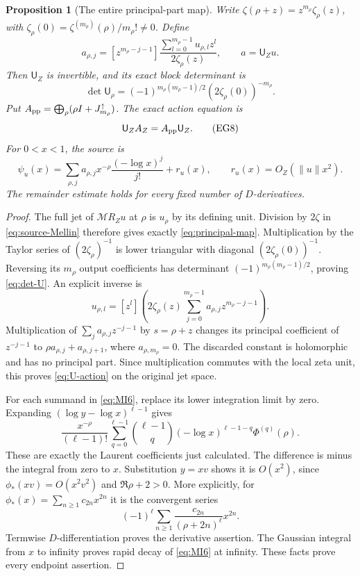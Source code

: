 \documentclass[11pt]{article}
\newtheorem{proposition}[theorem]{Proposition}
\newcommand{\M}{\mathcal M}\newcommand{\G}{\mathsf G}
\newcommand{\U}{\mathsf U}\newcommand{\E}{\mathsf E}
\begin{document}
\begin{proposition}[The entire principal-part map]\label{prop:principal}
Write $\zeta(\rho+z)=z^{m_\rho}\zeta_\rho(z)$, with
$\zeta_\rho(0)=\zeta^{(m_\rho)}(\rho)/m_\rho!\ne0$. Define
\[
 a_{\rho,j}=[z^{m_\rho-j-1}]
 \frac{\sum_{l=0}^{m_\rho-1}u_{\rho,l}z^l}{2\zeta_\rho(z)},
 \qquad a=\U_Zu.\tag{EG6}\label{eq:principal-map}
\]
Then $\U_Z$ is invertible, and its exact block determinant is
\[
 \det\U_\rho=(-1)^{m_\rho(m_\rho-1)/2}
                         (2\zeta_\rho(0))^{-m_\rho}.
 \tag{EG7}\label{eq:det-U}
\]
Put $A_{\rm pp}=\bigoplus_\rho(\rho I+J^\uparrow_{m_\rho})$.
The exact action equation is
\[
 \U_ZA_Z=A_{\rm pp}\U_Z.\tag{EG8}\label{eq:U-action}
\]
For $0<x<1$, the source is
\[
 \psi_u(x)=\sum_{\rho,j}a_{\rho,j}
                   x^{-\rho}\frac{(-\log x)^j}{j!}+r_u(x),
 \qquad r_u(x)=O_Z(\|u\|x^2).
 \tag{EG9}\label{eq:source-singular}
\]
The remainder estimate holds for every fixed number of $D$-derivatives.
\end{proposition}
\begin{proof}
The full jet of $\M R_Zu$ at $\rho$ is $u_\rho$ by its defining
unit. Division by $2\zeta$ in \eqref{eq:source-Mellin} therefore gives
exactly \eqref{eq:principal-map}. Multiplication by the Taylor series
of $(2\zeta_\rho)^{-1}$ is lower triangular with diagonal
$(2\zeta_\rho(0))^{-1}$. Reversing its $m_\rho$ output coefficients
has determinant $(-1)^{m_\rho(m_\rho-1)/2}$, proving \eqref{eq:det-U}.
An explicit inverse is
\[
 u_{\rho,l}=[z^l]\left(2\zeta_\rho(z)
                     \sum_{j=0}^{m_\rho-1}a_{\rho,j}z^{m_\rho-j-1}\right).
\]
Multiplication of $\sum_j a_{\rho,j}z^{-j-1}$ by $s=\rho+z$
changes its principal coefficient of $z^{-j-1}$ to
$\rho a_{\rho,j}+a_{\rho,j+1}$, where $a_{\rho,m_\rho}=0$.
The discarded constant is holomorphic and has no principal part.
Since multiplication commutes with the local zeta unit, this proves
\eqref{eq:U-action} on the original jet space.

For each summand in \eqref{eq:MI6}, replace its lower integration
limit by zero. Expanding $(\log y-\log x)^{\ell-1}$ gives
\[
 \frac{x^{-\rho}}{(\ell-1)!}
 \sum_{q=0}^{\ell-1}\binom{\ell-1}{q}
 (-\log x)^{\ell-1-q}\Phi^{(q)}(\rho).
\]
These are exactly the Laurent coefficients just calculated. The
difference is minus the integral from zero to $x$. Substitution
$y=xv$ shows it is $O(x^2)$, since $\phi_*(xv)=O(x^2v^2)$ and
$\Re\rho+2>0$. More explicitly, for
$\phi_*(x)=\sum_{n\ge1}c_{2n}x^{2n}$ it is the convergent series
\[
 (-1)^\ell\sum_{n\ge1}\frac{c_{2n}}{(\rho+2n)^\ell}x^{2n}.
\]
Termwise $D$-differentiation proves the derivative assertion. The
Gaussian integral from $x$ to infinity proves rapid decay of
\eqref{eq:MI6} at infinity. These facts prove every endpoint assertion.
\end{proof}
\end{document}
